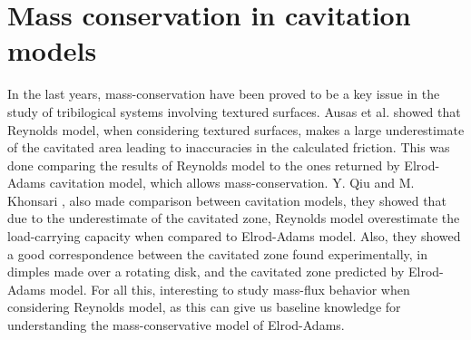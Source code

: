 \section{Mass conservation in cavitation models}\label{sec:mass_cons_cav_models}
In the last years, mass-conservation have been proved to be a key issue in the study of tribilogical systems involving textured surfaces. Ausas et al. \cite{ausas07} showed that Reynolds model, when considering textured surfaces, makes a large underestimate of the cavitated area leading to inaccuracies in the calculated friction. This was done comparing the results of Reynolds model to the ones returned by Elrod-Adams cavitation model, which allows mass-conservation. Y. Qiu and M. Khonsari \cite{qiu2009}, also made comparison between cavitation models, they showed that due to the underestimate of the cavitated zone, Reynolds model overestimate the load-carrying capacity when compared to Elrod-Adams model. Also, they showed a good correspondence between the cavitated zone found experimentally, in dimples made over a rotating disk, and the cavitated zone predicted by Elrod-Adams model. For all this, interesting to study mass-flux behavior when considering Reynolds model, as this can give us baseline knowledge for understanding the mass-conservative model of Elrod-Adams.


